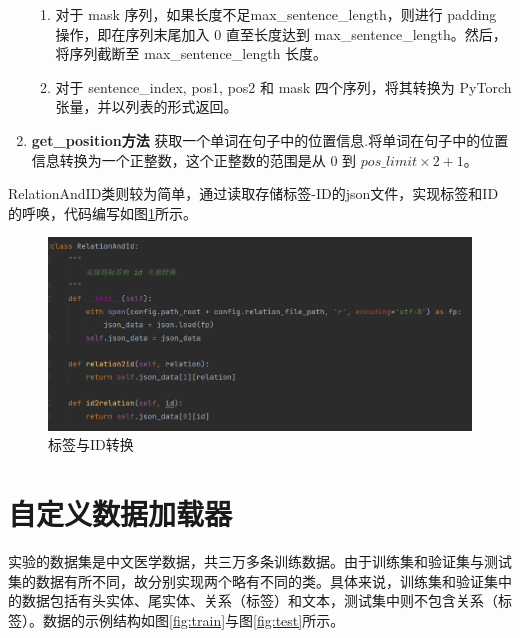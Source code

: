 \documentclass{report}
\begin{document}
\begin{enumerate}
\begin{enumerate}
			\item 对于 mask 序列，如果长度不足max\_sentence\_length，则进行 padding 操作，即在序列末尾加入 0 直至长度达到 max\_sentence\_length。然后，将序列截断至 max\_sentence\_length 长度。
			
			\item 对于 sentence\_index, pos1, pos2 和 mask 四个序列，将其转换为 PyTorch 张量，并以列表的形式返回。
		\end{enumerate}
		
		\item \textbf{get\_position方法} \quad 获取一个单词在句子中的位置信息.将单词在句子中的位置信息转换为一个正整数，这个正整数的范围是从 0 到 $pos\_limit \times 2 + 1$。
	\end{enumerate}
	
	RelationAndID类则较为简单，通过读取存储标签-ID的json文件，实现标签和ID的呼唤，代码编写如图\ref{fig:rai}所示。
	
	\begin{figure}[htbp]
		\centering
		\includegraphics[width=1.\textwidth]{fig/rai.png}
		\caption{标签与ID转换}
		\label{fig:rai}
	\end{figure}
	
	\section{自定义数据加载器}
	实验的数据集是中文医学数据，共三万多条训练数据。由于训练集和验证集与测试集的数据有所不同，故分别实现两个略有不同的类。具体来说，训练集和验证集中的数据包括有头实体、尾实体、关系（标签）和文本，测试集中则不包含关系（标签）。数据的示例结构如图\ref{fig:train}与图\ref{fig:test}所示。
	
\end{document}
